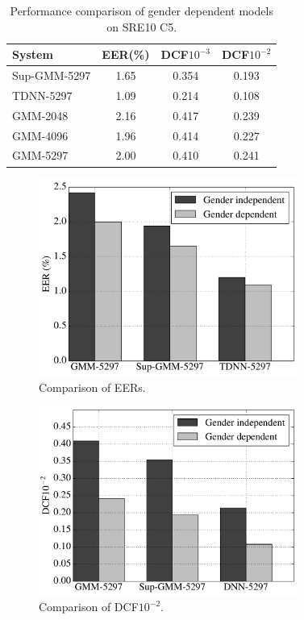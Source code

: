 \documentclass{article}
\begin{document}
\begin{table}
\begin{center}
\begin{tabular}{l|ccc}
\hline
System & EER(\%) & DCF$10^{-3}$ & DCF$10^{-2}$ \\ \hline \hline
Sup-GMM-5297 & 1.65 & 0.354 & 0.193 \\
TDNN-5297 & 1.09 & 0.214 & 0.108 \\
GMM-2048 & 2.16 & 0.417 & 0.239 \\
GMM-4096 & 1.96 & 0.414 & 0.227 \\
GMM-5297 & 2.00 & 0.410 & 0.241 \\ \hline
\end{tabular}
\end{center}
\caption{Performance comparison of gender dependent models on SRE10 C5.}
\label{gender_dep}
\end{table}

\begin{figure}[t]
\centerline{\includegraphics[width=8.5cm]{fig/eer}}
\caption{Comparison of EERs.}
\label{fig:eer}
\end{figure}

\begin{figure}[t]
\centerline{\includegraphics[width=8.5cm]{fig/dcf-2}}
\caption{Comparison of DCF$10^{-2}$.}
\label{fig:dcf_2}
\end{figure}
\end{document}
